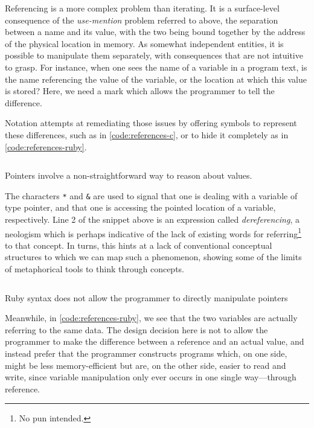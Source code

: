 Referencing is a more complex problem than iterating. It is a surface-level consequence of the \emph{use-mention} problem referred to above, the separation between a name and its value, with the two being bound together by the address of the physical location in memory. As somewhat independent entities, it is possible to manipulate them separately, with consequences that are not intuitive to grasp. For instance, when one sees the name of a variable in a program text, is the name referencing the value of the variable, or the location at which this value is stored? Here, we need a mark which allows the programmer to tell the difference.

Notation attempts at remediating those issues by offering symbols to represent these differences, such as in \autoref{code:references-c}, or to hide it completely as in \autoref{code:references-ruby}.

\begin{listing}
  \inputminted{c}{./corpus/references.c}
  \caption{Pointers involve a non-straightforward way to reason about values.}
  \label{code:references-c}
\end{listing}

The characters \lstinline{*} and \lstinline{&} are used to signal that one is dealing with a variable of type pointer, and that one is accessing the pointed location of a variable, respectively. Line 2 of the snippet above is an expression called \emph{dereferencing}, a neologism which is perhaps indicative of the lack of existing words for referring\footnote{No pun intended.} to that concept. In turns, this hints at a lack of conventional conceptual structures to which we can map such a phenomenon, showing some of the limits of metaphorical tools to think through concepts.

\begin{listing}
  \inputminted{python}{./corpus/references.rb}
  \caption{Ruby syntax does not allow the programmer to directly manipulate pointers}
  \label{code:references-ruby}
\end{listing}

Meanwhile, in \autoref{code:references-ruby}, we see that the two variables are actually referring to the same data. The design decision here is not to allow the programmer to make the difference between a reference and an actual value, and instead prefer that the programmer constructs programs which, on one side, might be less memory-efficient but are, on the other side, easier to read and write, since variable manipulation only ever occurs in one single way—through reference.

